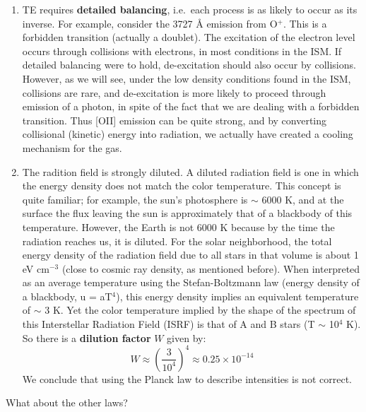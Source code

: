\documentclass[11pt]{article}
\newcommand{\mar}[1]{\hspace{0pt}\marginpar{-\textcolor{black}{#1}-}}
\begin{document}
\begin{enumerate}[itemsep=1ex]
    \item TE requires \textbf{detailed balancing},
        i.e.\ each process is as likely to occur as its inverse. For
        example, consider the 3727 \AA{} emission from O$^{+}$. This is a
        forbidden transition (actually a doublet). The excitation of the
        electron level occurs through collisions with electrons, in most
        conditions in the ISM\@. If detailed balancing were to hold,
        de-excitation should also occur by collisions. However, as we will
        see, under the low density conditions found in the ISM, collisions
        are rare, and de-excitation is more likely to proceed through
        emission of a photon, in spite of the fact that we are dealing with
        a forbidden transition. Thus [OII] emission can be quite strong,
        and by converting collisional (kinetic) energy into radiation, we
        actually have created a cooling mechanism for the gas.
    \item The radition field is strongly diluted. A diluted radiation field
        is one in which the energy density does not match the color
        temperature. This concept is quite familiar; for example, the sun's
        photosphere is $\sim$ 6000 K, and at the surface the flux leaving
        the sun is approximately that of a blackbody of this temperature.
        However, the Earth is not 6000 K because by the time the radiation
        reaches us, it is diluted. \mar{20}For the solar neighborhood, the
        total energy density of the radiation field due to all stars in
        that volume is about 1 eV cm$^{-3}$ (close to cosmic ray density,
        as mentioned before). When interpreted as an average temperature
        using the Stefan-Boltzmann law (energy density of a blackbody, u =
        aT$^{4}$), this energy density implies an equivalent temperature of
        $\sim$ 3 K. Yet the color temperature implied by the shape of the
        spectrum of this Interstellar Radiation Field (ISRF) is that of A
        and B stars (T $\sim$ 10$^{4}$ K). So there is a \textbf{dilution
        factor} $W$ given by:
        \[
            W \approx \left( \frac{3}{10^{4}} \right) ^{4}
              \approx 0.25\times10^{-14}
            \]
        We conclude that using the Planck law to
        describe intensities is not correct.
\end{enumerate}
What about the other laws?
\end{document}

